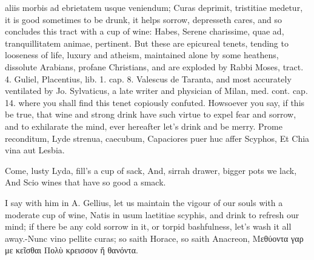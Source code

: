 aliis morbis ad ebrietatem usque veniendum; Curas deprimit, tristitiae
medetur, it is good sometimes to be drunk, it helps sorrow, depresseth
cares, and so concludes this tract with a cup of wine: Habes, Serene
charissime, quae ad, tranquillitatem animae, pertinent. But these are
epicureal tenets, tending to looseness of life, luxury and atheism,
maintained alone by some heathens, dissolute Arabians, profane
Christians, and are exploded by Rabbi Moses, tract. 4. Guliel,
Placentius, lib. 1. cap. 8. Valescus de Taranta, and most accurately
ventilated by Jo. Sylvaticus, a late writer and physician of Milan,
med. cont. cap. 14. where you shall find this tenet copiously confuted.
Howsoever you say, if this be true, that wine and strong drink have
such virtue to expel fear and sorrow, and to exhilarate the mind, ever
hereafter let's drink and be merry.
Prome reconditum, Lyde strenua, caecubum,
Capaciores puer huc affer Scyphos,
Et Chia vina aut Lesbia.

Come, lusty Lyda, fill's a cup of sack,
And, sirrah drawer, bigger pots we lack,
And Scio wines that have so good a smack.

I say with him in A. Gellius, let us maintain the vigour of our
souls with a moderate cup of wine, Natis in usum laetitiae
scyphis, and drink to refresh our mind; if there be any cold sorrow in
it, or torpid bashfulness, let's wash it all away.-Nunc vino pellite
curas; so saith Horace, so saith Anacreon,
Μεθύοντα γαρ με κεῖσθαι
Πολὺ κρεισσον ἤ θανόντα.

